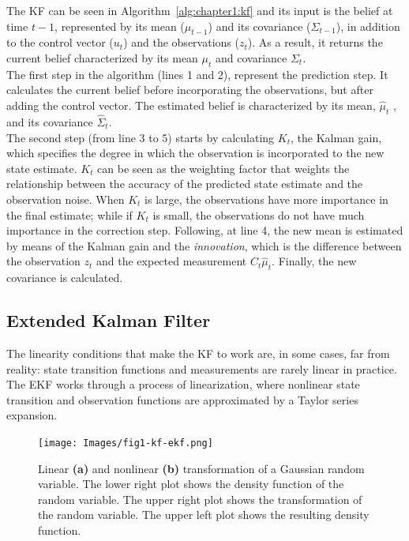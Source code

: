 The KF can be seen in Algorithm~\ref{alg:chapter1:kf} and its input is the belief at time $t-1$, represented by its mean ($\mu_{t-1}$) and its covariance ($\Sigma_{t-1}$), in addition to the control vector ($u_t$) and the observations ($z_t$). As a result, it returns the current belief characterized by its mean $\mu_t$ and covariance $\Sigma_t$. \\

The first step in the algorithm (lines 1 and 2), represent the prediction step. It calculates the current belief before incorporating the observations, but after adding the control vector. The estimated belief is characterized by its mean, $\hat\mu_t$ , and its covariance $\hat\Sigma_t$.\\

The second step (from line 3 to 5) starts by calculating $K_t$, the Kalman gain, which specifies the degree in which the observation is incorporated to the new state estimate. $K_t$ can be seen as the weighting factor that weights the relationship between the accuracy of the predicted state estimate and the observation noise. When $K_t$ is large, the observations have more importance in the final estimate; while if $K_t$ is small, the observations do not have much importance in the correction step. Following, at line 4, the new mean is estimated by means of the Kalman gain and the \emph{innovation}, which is the difference between the observation $z_t$ and the expected measurement $C_t \hat\mu_t$. Finally, the new covariance is calculated.

\subsection{Extended Kalman Filter}
\label{subsec:chapter1:kf:ekf}

The linearity conditions that make the KF to work are, in some cases, far from reality: state transition functions and measurements are rarely linear in practice. The \ac{EKF} works through a process of linearization, where nonlinear state transition and observation functions are approximated by a Taylor series expansion. \\

\begin{figure}
    \centering
    \texttt{[image: Images/fig1-kf-ekf.png]}
    \caption[Linear and nonlinear transformation of a Gaussian random variable]{Linear \textbf{(a)} and nonlinear \textbf{(b)} transformation of a Gaussian random variable. The lower right plot shows the density function of the random variable. The upper right plot shows the transformation of the random variable. The upper left plot shows the resulting density function. \cite{prob-robotics}}
    \label{fig:chapter1:kf:ekf:cmp-kf-ekf}
\end{figure}

